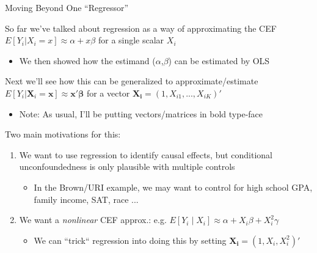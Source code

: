 \documentclass[11pt,handout,aspectratio=169]{beamer}
\newenvironment{wideitemize}{\itemize\addtolength{\itemsep}{10pt}}{\enditemize}
\begin{document}
	\begin{frame}{Moving Beyond One ``Regressor''}
		\begin{wideitemize}
			
			\item
			So far we've talked about regression as a way of approximating the CEF $E[Y_i|X_i =x ] \approx \alpha + x \beta $ for a single scalar $X_i$\smallskip
			\begin{itemize}
					\item 
					We then showed how the estimand ($\alpha$,$\beta$) can be estimated by OLS
				\end{itemize}
			
			\pause
			\item
			Next we'll see how this can be generalized to approximate/estimate $E[Y_i| \mathbf{X}_i =\mathbf{x} ] \approx \mathbf{x}' \bm{\beta}$ for a vector $ \mathbf{X_i} = (1,X_{i1},...,X_{iK})'$ 
				\begin{itemize}\smallskip
					\item 
					Note: As usual, I'll be putting vectors/matrices in bold type-face
				\end{itemize}
			
			\pause
			\item
			Two main motivations for this: \medskip
			\end{wideitemize}	

			\pause
\begin{enumerate}
			\item
			We want to use regression to identify causal effects, but conditional unconfoundedness is only plausible with multiple controls \smallskip
			\begin{itemize}
				\item 
				In the Brown/URI example, we may want to control for high school GPA, family income, SAT, race ...
			\end{itemize}
			\medskip
			
			\pause
			\item
			We want a \emph{nonlinear} CEF approx.: e.g. $E[Y_i\mid X_i]\approx\alpha+X_i\beta+X_i^2\gamma$ \smallskip
			\begin{itemize}
			\item We can ``trick`` regression into doing this by setting $\mathbf{X_i} = (1, X_{i}, X_{i}^2)'$
			\end{itemize}
			\end{enumerate}
			
		
		
	\end{frame}
	
		

	
\end{document}
